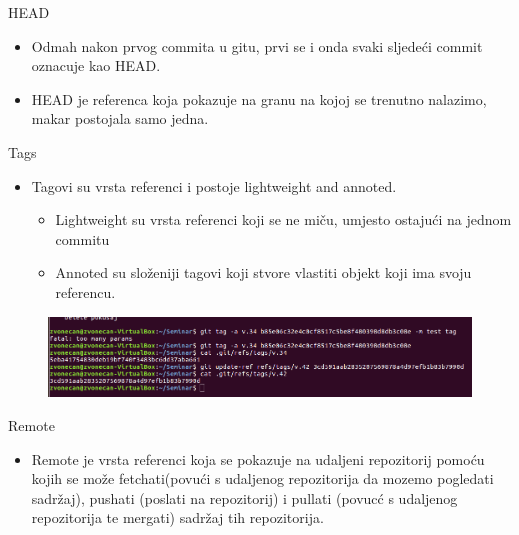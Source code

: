 \documentclass{beamer}
\begin{document}
\begin{frame}{HEAD}
	\begin{itemize}
	\item Odmah nakon prvog commita u gitu, prvi se i onda svaki sljedeći commit oznacuje kao HEAD.
	\item HEAD je referenca koja pokazuje na granu na kojoj se trenutno nalazimo, makar postojala samo jedna.
	\end{itemize}
\end{frame}
\begin{frame}{Tags}
	\begin{itemize}
	\item Tagovi su vrsta referenci i postoje lightweight and annoted.
	\begin{itemize}
	\item Lightweight su vrsta referenci koji se ne miču, umjesto ostajući na jednom commitu
	\item Annoted su složeniji tagovi koji stvore vlastiti objekt koji ima svoju referencu.
	\end{itemize}
\end{itemize}
\end{frame}
\begin{frame}
	\begin{figure}
	\includegraphics[width=1\textwidth]{./slike/tag.png}
	\end{figure}
\end{frame}
\begin{frame}{Remote}
	\begin{itemize}
	\item Remote je vrsta referenci koja se pokazuje na udaljeni repozitorij pomoću kojih se može fetchati(povući s udaljenog repozitorija da mozemo pogledati sadržaj), pushati (poslati na repozitorij) i pullati (povucć s udaljenog repozitorija te mergati) sadržaj tih repozitorija.  
	\end{itemize}
\end{frame}
\end{document}
